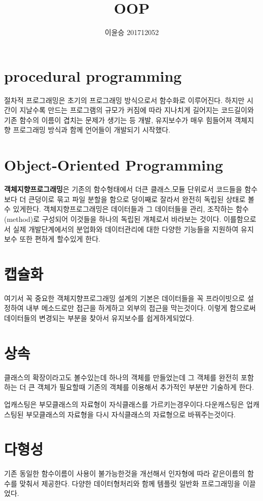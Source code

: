 \documentclass{oblivoir}
\begin{document}
\title{OOP}
\author{이윤승 201712052}
\maketitle
\tableofcontents

\section{procedural programming}
절차적 프로그래밍은 초기의 프로그래밍 방식으로서 함수화로 이루어진다. 하지만 시간이 지날수록 만드는 프로그램의 규모가 커짐에 따라 지나치게 길어지는 코드길이와 기존 함수의 이름이 겹치는 문제가 생기는 등 개발, 유지보수가 매우 힘들어져 객체지향 프로그래밍 방식과 함께 언어들이 개발되기 시작했다.

\section{Object-Oriented Programming}
\textbf{객체지향프로그래밍}은 기존의 함수형태에서 더큰 클래스,모듈 단위로서 코드들을 함수보다 더 큰덩이로 묶고 파일 분할을 함으로 덩이째로 잘라서 완전히 독립된 상태로 볼 수 있게한다. 객체지향프로그래밍은 데이터들과 그 데이터들을 관리, 조작하는 함수(method)로 구성되어 이것들을 하나의 독립된 개체로서 바라보는 것이다. 이를함으로서 실제 개발단계에서의 분업화와 데이터관리에 대한 다양한 기능들을 지원하여 유지보수 또한 편하게 할수있게 한다. 


\section{캡슐화} 
여기서 꼭 중요한 객체지향프로그래밍 설계의 기본은 데이터들을 꼭 프라이빗으로 설정하여 내부 메소드로만 접근을 하게하고 외부의 접근을 막는것이다. 이렇게 함으로써 데이터들의 변경되는 부분을 찾아서 유지보수를 쉽게하게되었다.


\section {상속} 
클래스의 확장이라고도 볼수있는데 하나의 객체를 만들었는데 그 객체를 완전히 포함하는 더 큰 객체가 필요할때 기존의 객체를 이용해서 추가적인 부분만 기술하게 한다.

업캐스팅은 부모클래스의 자료형이 자식클래스를 가르키는경우이다.다운캐스팅은 업캐스팅된 부모클래스의 자료형을 다시 자식클래스의 자료형으로 바꿔주는것이다.

\section {다형성}
기존 동일한 함수이름이 사용이 불가능한것을 개선해서 인자형에 따라 같은이름의 함수를 맞춰서 제공한다.  다양한 데이터형처리와 함께 템플릿 일반화 프로그래밍을 이끌었다.
\end{document}
